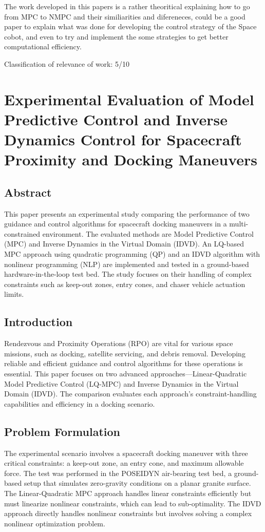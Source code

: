 \documentclass[a4paper,12pt]{article}
\begin{document}
        The work developed in this papers is a rather theoritical explaining how to go from MPC to NMPC and their similiarities and difereneces, could be a good paper to explain what was done for developing the control strategy of the Space cobot, and even to try and implement the some strategies to get better computational efficiency.

        Classification of relevance of work: 5/10
    
\section{Experimental Evaluation of Model Predictive Control and Inverse Dynamics Control for Spacecraft Proximity and Docking Maneuvers}


    \subsection{Abstract}
        This paper presents an experimental study comparing the performance of two guidance and control algorithms for spacecraft docking maneuvers in a multi-constrained environment. The evaluated methods are Model Predictive Control (MPC) and Inverse Dynamics in the Virtual Domain (IDVD). An LQ-based MPC approach using quadratic programming (QP) and an IDVD algorithm with nonlinear programming (NLP) are implemented and tested in a ground-based hardware-in-the-loop test bed. The study focuses on their handling of complex constraints such as keep-out zones, entry cones, and chaser vehicle actuation limits.

    \subsection{Introduction}
        Rendezvous and Proximity Operations (RPO) are vital for various space missions, such as docking, satellite servicing, and debris removal. Developing reliable and efficient guidance and control algorithms for these operations is essential. This paper focuses on two advanced approaches—Linear-Quadratic Model Predictive Control (LQ-MPC) and Inverse Dynamics in the Virtual Domain (IDVD). The comparison evaluates each approach's constraint-handling capabilities and efficiency in a docking scenario.

    \subsection{Problem Formulation}
        The experimental scenario involves a spacecraft docking maneuver with three critical constraints: a keep-out zone, an entry cone, and maximum allowable force. The test was performed in the POSEIDYN air-bearing test bed, a ground-based setup that simulates zero-gravity conditions on a planar granite surface. The Linear-Quadratic MPC approach handles linear constraints efficiently but must linearize nonlinear constraints, which can lead to sub-optimality. The IDVD approach directly handles nonlinear constraints but involves solving a complex nonlinear optimization problem.
\end{document}
